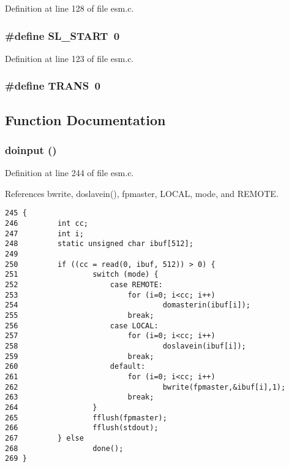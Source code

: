 Definition at line 128 of file esm.c.
\subsubsection{\setlength{\rightskip}{0pt plus 5cm}\#define SL\_\-START\ 0}\label{esm_8c_a3}




Definition at line 123 of file esm.c.
\subsubsection{\setlength{\rightskip}{0pt plus 5cm}\#define TRANS\ 0}\label{esm_8c_a11}




\subsection{Function Documentation}
\subsubsection{\setlength{\rightskip}{0pt plus 5cm}doinput ()}\label{esm_8c_a49}




Definition at line 244 of file esm.c.

References bwrite, doslavein(), fpmaster, LOCAL, mode, and REMOTE.



\footnotesize\begin{verbatim}245 {
246         int cc;
247         int i;
248         static unsigned char ibuf[512];
249         
250         if ((cc = read(0, ibuf, 512)) > 0) {
251                 switch (mode) {
252                     case REMOTE:
253                         for (i=0; i<cc; i++)
254                                 domasterin(ibuf[i]);
255                         break;
256                     case LOCAL:
257                         for (i=0; i<cc; i++)
258                                 doslavein(ibuf[i]);
259                         break;
260                     default:
261                         for (i=0; i<cc; i++)
262                                 bwrite(fpmaster,&ibuf[i],1);
263                         break;
264                 }
265                 fflush(fpmaster);
266                 fflush(stdout);
267         } else
268                 done();
269 }
\end{verbatim}\normalsize 


